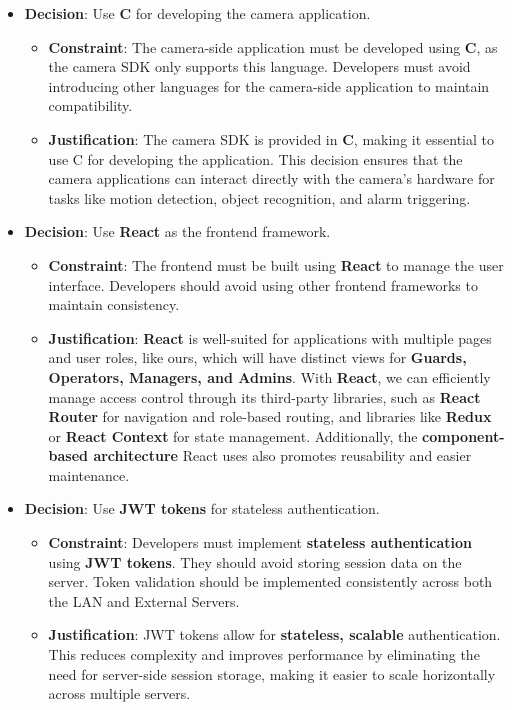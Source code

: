 \documentclass{article}
\begin{document}
\begin{itemize}
\begin{itemize}
    \end{itemize}
    \item \textbf{Decision}: Use \textbf{C} for developing the camera application.
    \begin{itemize}
        \item \textbf{Constraint}: The camera-side application must be developed using \textbf{C}, as the camera SDK only supports this language. Developers must avoid introducing other languages for the camera-side application to maintain compatibility.
        \item \textbf{Justification}: The camera SDK is provided in \textbf{C}, making it essential to use C for developing the application. This decision ensures that the camera applications can interact directly with the camera’s hardware for tasks like motion detection, object recognition, and alarm triggering.
    \end{itemize}
    \item \textbf{Decision}: Use \textbf{React} as the frontend framework.
    \begin{itemize}
        \item \textbf{Constraint}: The frontend must be built using \textbf{React} to manage the user interface. Developers should avoid using other frontend frameworks to maintain consistency.
        \item \textbf{Justification}: \textbf{React} is well-suited for applications with multiple pages and user roles, like ours, which will have distinct views for \textbf{Guards, Operators, Managers, and Admins}. With \textbf{React}, we can efficiently manage access control through its third-party libraries, such as \textbf{React Router} for navigation and role-based routing, and libraries like \textbf{Redux} or \textbf{React Context} for state management. Additionally, the \textbf{component-based architecture} React uses also promotes reusability and easier maintenance.
    \end{itemize}
    \item \textbf{Decision}: Use \textbf{JWT tokens} for stateless authentication.
    \begin{itemize}
        \item \textbf{Constraint}: Developers must implement \textbf{stateless authentication} using \textbf{JWT tokens}. They should avoid storing session data on the server. Token validation should be implemented consistently across both the LAN and External Servers.
        \item \textbf{Justification}: JWT tokens allow for \textbf{stateless, scalable} authentication. This reduces complexity and improves performance by eliminating the need for server-side session storage, making it easier to scale horizontally across multiple servers.

\end{itemize}
\end{itemize}
\end{document}
